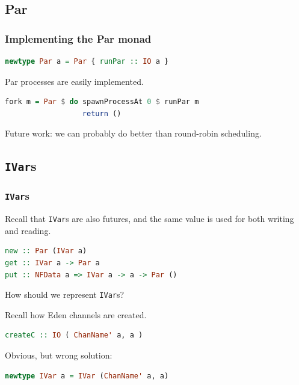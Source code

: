 \documentclass[12pt, danish]{beamer}
\begin{document}
\subsection{Par}

\begin{frame}[fragile]
\frametitle{Implementing the Par monad}

\begin{lstlisting}[language=Haskell]
newtype Par a = Par { runPar :: IO a }
\end{lstlisting}
\pause
Par processes are easily implemented.

\begin{lstlisting}[language=Haskell]
fork m = Par $ do spawnProcessAt 0 $ runPar m
                  return ()
\end{lstlisting}
\pause Future work: we can probably do better than round-robin
scheduling.
\end{frame}

\subsection{\texttt{IVar}s}

\begin{frame}[fragile]
\frametitle{\texttt{IVar}s}

Recall that \texttt{IVar}s are also futures, and the same value is
used for both writing and reading.

\begin{lstlisting}[language=Haskell]
new :: Par (IVar a)
get :: IVar a -> Par a
put :: NFData a => IVar a -> a -> Par ()
\end{lstlisting}

How should we represent \texttt{IVar}s?

\pause

Recall how Eden channels are created.

\begin{lstlisting}[language=Haskell]
createC :: IO ( ChanName' a, a )
\end{lstlisting}

\pause

Obvious, but wrong solution:

\begin{lstlisting}[language=Haskell]
newtype IVar a = IVar (ChanName' a, a)
\end{lstlisting}

\end{frame}
\end{document}
